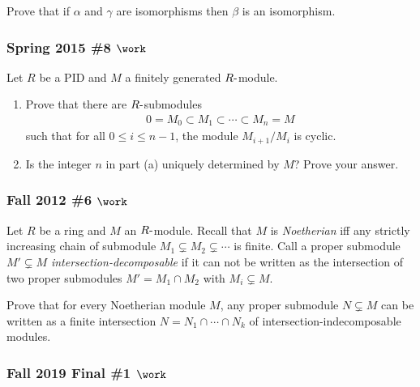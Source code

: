 Prove that if \(\alpha\) and \(\gamma\) are isomorphisms then \(\beta\)
is an isomorphism.

\hypertarget{spring-2015-8-work}{%
\subsubsection{\texorpdfstring{Spring 2015 \#8
\(\work\)}{Spring 2015 \#8 \textbackslash work}}\label{spring-2015-8-work}}

Let \(R\) be a PID and \(M\) a finitely generated \(R{\hbox{-}}\)module.

\begin{enumerate}
\def\labelenumi{\alph{enumi}.}
\item
  Prove that there are \(R{\hbox{-}}\)submodules
  \begin{align*}
  0 = M_0 \subset M_1 \subset \cdots \subset M_n = M
  \end{align*}
  such that for all \(0\leq i \leq n-1\), the module \(M_{i+1}/M_i\) is
  cyclic.
\item
  Is the integer \(n\) in part (a) uniquely determined by \(M\)? Prove
  your answer.
\end{enumerate}

\hypertarget{fall-2012-6-work}{%
\subsubsection{\texorpdfstring{Fall 2012 \#6
\(\work\)}{Fall 2012 \#6 \textbackslash work}}\label{fall-2012-6-work}}

Let \(R\) be a ring and \(M\) an \(R{\hbox{-}}\)module. Recall that
\(M\) is \emph{Noetherian} iff any strictly increasing chain of
submodule \(M_1 \subsetneq M_2 \subsetneq \cdots\) is finite. Call a
proper submodule \(M' \subsetneq M\) \emph{intersection-decomposable} if
it can not be written as the intersection of two proper submodules
\(M' = M_1\cap M_2\) with \(M_i \subsetneq M\).

Prove that for every Noetherian module \(M\), any proper submodule
\(N\subsetneq M\) can be written as a finite intersection
\(N = N_1 \cap\cdots \cap N_k\) of intersection-indecomposable modules.

\hypertarget{fall-2019-final-1-work}{%
\subsubsection{\texorpdfstring{Fall 2019 Final \#1
\(\work\)}{Fall 2019 Final \#1 \textbackslash work}}\label{fall-2019-final-1-work}}

